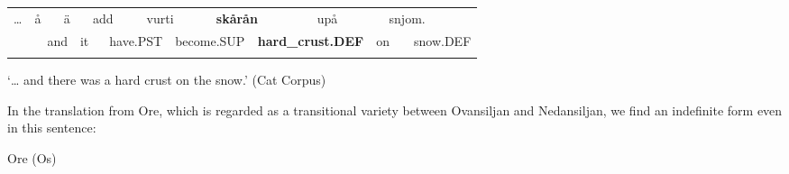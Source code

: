 \begin{tabular}{llllllllllllllll}
\lsptoprule
… & \multicolumn{2}{l}{å

} & \multicolumn{2}{l}{ä

} & \multicolumn{2}{l}{add

} & \multicolumn{2}{l}{vurti

} & \multicolumn{2}{l}{{\bfseries skårån}

} & \multicolumn{2}{l}{upå

} & \multicolumn{2}{l}{snjom.

} & \\
\multicolumn{2}{l}{} & \multicolumn{2}{l}{and

} & \multicolumn{2}{l}{it

} & \multicolumn{2}{l}{have.PST

} & \multicolumn{2}{l}{become.SUP

} & \multicolumn{2}{l}{{\bfseries hard\_crust.DEF}

} & \multicolumn{2}{l}{on

} & \multicolumn{2}{l}{snow.DEF

}\\
\lspbottomrule
\end{tabular}

\begin{styleTranslation}
‘… and there was a hard crust on the snow.’ (Cat Corpus)

\end{styleTranslation}

\begin{styleBodyTextFirst}
In the translation from Ore, which is regarded as a transitional variety between Ovansiljan and Nedansiljan, we find an indefinite form even in this sentence:

\end{styleBodyTextFirst}

\begin{listWWNumileveli}
\item {}

\begin{styleExample}
Ore (Os)

\end{styleExample}

\end{listWWNumileveli}

